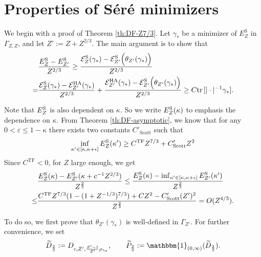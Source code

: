 \documentclass[a4paper]{amsart}
\def\tr{{\rm tr \,}}
\def\eps{\varepsilon}
\def\cE{{\mathcal E}}
\begin{document}
\section{Properties of S\'er\'e minimizers}\label{sec:Z7/3}
We begin with a proof of Theorem \ref{th:DF-Z7/3}.  Let $\gamma_{*}$
be a minimizer of $E^\mathrm{S}_{Z}$ in $\Gamma_{Z,Z}$, and let
$Z':=Z+Z^{2/3}$. The main argument is to show that
  \begin{equation}
    \begin{split}
    &\frac{E_{Z}^{\rm S}-E_{Z'}^{\rm S}}{Z^{2/3}}\geq \frac{\cE_{Z}^{\rm S}(\gamma_*)-\cE_{Z'}^{\rm S}\Big(\theta_{Z'}(\gamma_*)\Big)}{Z^{2/3}}\\
    =& \frac{\cE_{Z}^{\rm S}(\gamma_*)-\cE_{Z'}^{\rm HA}(\gamma_*)}{Z^{2/3}}+ \frac{\cE_{Z'}^{\rm HA}(\gamma_*)-\cE_{Z'}^{\rm S}\Big(\theta_{Z'}(\gamma_*)\Big)}{Z^{2/3}} \geq C \tr[|\cdot|^{-1}\gamma_*].
    \end{split}
  \end{equation}

  Note that $E_{Z}^{\rm S}$ is also dependent on $\kappa$. So we write
  $E_Z^{\rm S}(\kappa)$ to emphasis the dependence on $\kappa$. From
  Theorem \ref{th:DF-asymptotic}, we know that for any
  $0<\eps\leq 1-\kappa$ there exists two constants $C'_\mathrm{Scott}$ such
  that
\begin{align*}
     \inf_{\kappa'\in [\kappa,\kappa+\epsilon]}  E_Z^{\rm S}(\kappa')\geq C^\mathrm{TF}Z^{7/3}+C'_\mathrm{Scott}Z^2
\end{align*}
Since $C^\mathrm{TF}<0$, for $Z$ large enough, we get
\begin{equation}
\begin{split}
    & \frac{E_{Z}^{\rm S}(\kappa)-E_{Z'}^{\rm S}(\kappa+c^{-1}Z^{2/3})}{Z^{\frac23}}\leq  \frac{E_{Z}^{\rm S}(\kappa)-\inf_{\kappa'\in [\kappa,\kappa+\epsilon]}E_{Z'}^{\rm S}(\kappa') }{Z^{\frac23}} \\
     \leq&  \frac{C^\mathrm{TF}Z^{7/3}(1-(1+Z^{-1/3})^{7/3})+CZ^2-C'_\mathrm{Scott}(Z')^2}{Z^{\frac23}}= O(Z^{4/3}).
\end{split}
\end{equation}

To do so, we first prove that $\theta_{Z'}(\gamma_*)$ is well-defined
in $\Gamma_{Z'}$. For further convenience, we set
\begin{equation}
   \widetilde{D}_{\frac23}:=D_{c,Z',\frac{Z'-1}{Z'}\rho_{\gamma_*}},\qquad  \widetilde{P}_{\frac23}:=\mathbbm{1}_{(0,\infty)}(\widetilde{D}_{\frac23}).
\end{equation}
\end{document}
